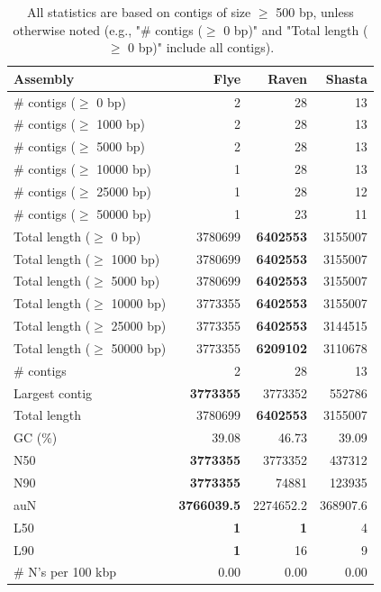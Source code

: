 \documentclass[12pt,a4paper]{article}
\begin{document}
\begin{table}[ht]
\begin{center}
\caption{All statistics are based on contigs of size $\geq$ 500 bp, unless otherwise noted (e.g., "\# contigs ($\geq$ 0 bp)" and "Total length ($\geq$ 0 bp)" include all contigs).}
\begin{tabular}{|l*{3}{|r}|}
\hline
Assembly & Flye & Raven & Shasta \\ \hline
\# contigs ($\geq$ 0 bp) & 2 & 28 & 13 \\ \hline
\# contigs ($\geq$ 1000 bp) & 2 & 28 & 13 \\ \hline
\# contigs ($\geq$ 5000 bp) & 2 & 28 & 13 \\ \hline
\# contigs ($\geq$ 10000 bp) & 1 & 28 & 13 \\ \hline
\# contigs ($\geq$ 25000 bp) & 1 & 28 & 12 \\ \hline
\# contigs ($\geq$ 50000 bp) & 1 & 23 & 11 \\ \hline
Total length ($\geq$ 0 bp) & 3780699 & {\bf 6402553} & 3155007 \\ \hline
Total length ($\geq$ 1000 bp) & 3780699 & {\bf 6402553} & 3155007 \\ \hline
Total length ($\geq$ 5000 bp) & 3780699 & {\bf 6402553} & 3155007 \\ \hline
Total length ($\geq$ 10000 bp) & 3773355 & {\bf 6402553} & 3155007 \\ \hline
Total length ($\geq$ 25000 bp) & 3773355 & {\bf 6402553} & 3144515 \\ \hline
Total length ($\geq$ 50000 bp) & 3773355 & {\bf 6209102} & 3110678 \\ \hline
\# contigs & 2 & 28 & 13 \\ \hline
Largest contig & {\bf 3773355} & 3773352 & 552786 \\ \hline
Total length & 3780699 & {\bf 6402553} & 3155007 \\ \hline
GC (\%) & 39.08 & 46.73 & 39.09 \\ \hline
N50 & {\bf 3773355} & 3773352 & 437312 \\ \hline
N90 & {\bf 3773355} & 74881 & 123935 \\ \hline
auN & {\bf 3766039.5} & 2274652.2 & 368907.6 \\ \hline
L50 & {\bf 1} & {\bf 1} & 4 \\ \hline
L90 & {\bf 1} & 16 & 9 \\ \hline
\# N's per 100 kbp & 0.00 & 0.00 & 0.00 \\ \hline
\end{tabular}
\end{center}
\end{table}
\end{document}

